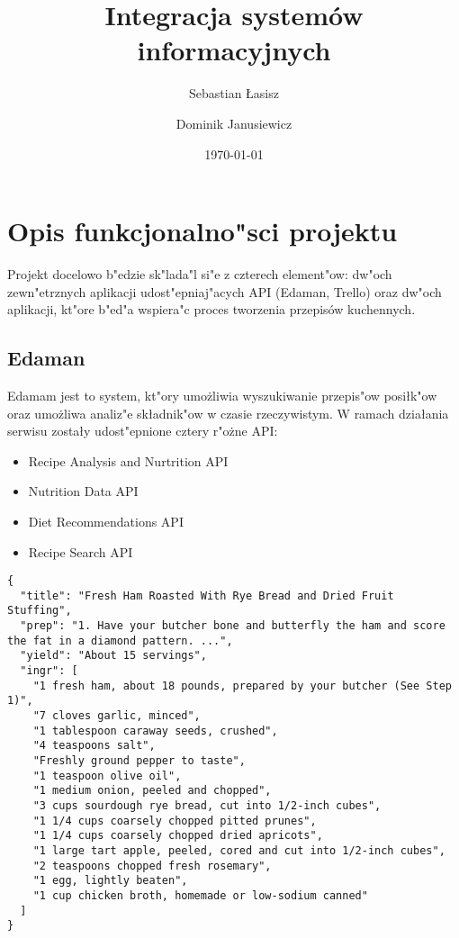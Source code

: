 \documentclass{article}
\title{Integracja systemów informacyjnych}
\author{
	Sebastian Łasisz
	\and
	Dominik Janusiewicz}
\date{\today}
\begin{document}
\maketitle

\section{Opis funkcjonalno"sci projektu}

	Projekt docelowo b"edzie sk"lada"l si"e z czterech element"ow: dw"och zewn"etrznych aplikacji udost"epniaj"acych API (Edaman, Trello) oraz dw"och 	aplikacji, kt"ore b"ed"a wspiera"c proces tworzenia przepisów kuchennych. 

\subsection{Edaman}
	Edamam jest to system, kt"ory umo\.zliwia wyszukiwanie przepis"ow posiłk"ow oraz umo\.zliwa analiz"e składnik"ow w czasie rzeczywistym. W ramach działania serwisu zostały udost"epnione cztery r"o\.zne API:
	\begin{itemize}
		\item Recipe Analysis and Nurtrition API
		\item Nutrition Data API
		\item Diet Recommendations API
		\item Recipe Search API
	\end{itemize}
	
	\begin{lstlisting}[label=edaman,caption=Edaman API Example,breaklines=true]
{
  "title": "Fresh Ham Roasted With Rye Bread and Dried Fruit Stuffing",
  "prep": "1. Have your butcher bone and butterfly the ham and score the fat in a diamond pattern. ...",
  "yield": "About 15 servings",
  "ingr": [
    "1 fresh ham, about 18 pounds, prepared by your butcher (See Step 1)",
    "7 cloves garlic, minced",
    "1 tablespoon caraway seeds, crushed",
    "4 teaspoons salt",
    "Freshly ground pepper to taste",
    "1 teaspoon olive oil",
    "1 medium onion, peeled and chopped",
    "3 cups sourdough rye bread, cut into 1/2-inch cubes",
    "1 1/4 cups coarsely chopped pitted prunes",
    "1 1/4 cups coarsely chopped dried apricots",
    "1 large tart apple, peeled, cored and cut into 1/2-inch cubes",
    "2 teaspoons chopped fresh rosemary",
    "1 egg, lightly beaten",
    "1 cup chicken broth, homemade or low-sodium canned"
  ]
}
	\end{lstlisting}
\end{document}
